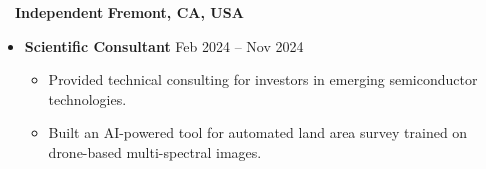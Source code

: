 ~~{\color{black}\textbf{Independent} \hfill  \textbf{Fremont, CA, USA}}\par
\begin{itemize}
    \item
        \textbf{Scientific Consultant}
        \hfill  {Feb 2024 -- Nov 2024} \par
        \begin{itemize}
            \item Provided technical consulting for investors in emerging semiconductor technologies. 
            \item Built an AI-powered tool for automated land area survey trained on drone-based multi-spectral images. 
        \end{itemize}
\end{itemize}